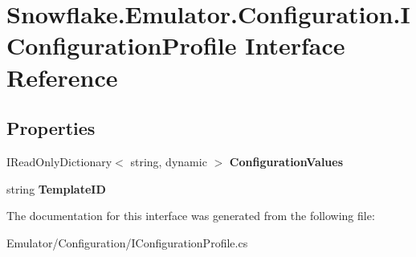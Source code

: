 \hypertarget{interface_snowflake_1_1_emulator_1_1_configuration_1_1_i_configuration_profile}{}\section{Snowflake.\+Emulator.\+Configuration.\+I\+Configuration\+Profile Interface Reference}
\label{interface_snowflake_1_1_emulator_1_1_configuration_1_1_i_configuration_profile}
\subsection*{Properties}
\begin{DoxyCompactItemize}
\item 
\hypertarget{interface_snowflake_1_1_emulator_1_1_configuration_1_1_i_configuration_profile_a78d5d85323b8e4fe20076fd90d7b763b}{}I\+Read\+Only\+Dictionary$<$ string, dynamic $>$ {\bfseries Configuration\+Values}\label{interface_snowflake_1_1_emulator_1_1_configuration_1_1_i_configuration_profile_a78d5d85323b8e4fe20076fd90d7b763b}

\item 
\hypertarget{interface_snowflake_1_1_emulator_1_1_configuration_1_1_i_configuration_profile_a42ca25a1cf6240a3015f1fc059c022aa}{}string {\bfseries Template\+I\+D}\label{interface_snowflake_1_1_emulator_1_1_configuration_1_1_i_configuration_profile_a42ca25a1cf6240a3015f1fc059c022aa}

\end{DoxyCompactItemize}


The documentation for this interface was generated from the following file\+:\begin{DoxyCompactItemize}
\item 
Emulator/\+Configuration/I\+Configuration\+Profile.\+cs\end{DoxyCompactItemize}
